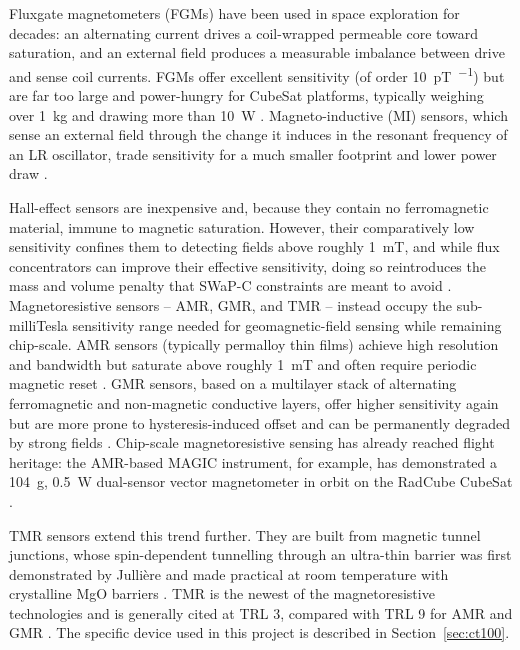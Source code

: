 \documentclass[12pt,a4paper]{article}
\begin{document}
Fluxgate magnetometers (FGMs) have been used in space exploration for decades: an alternating current drives a coil-wrapped permeable core toward saturation, and an external field produces a measurable imbalance between drive and sense coil currents. FGMs offer excellent sensitivity (of order \SI{10}{\pico\tesla\per\sqrt{\hertz}}) but are far too large and power-hungry for CubeSat platforms, typically weighing over \SI{1}{\kilo\gram} and drawing more than \SI{10}{\watt} \cite{survey-magnetic-sensing}. Magneto-inductive (MI) sensors, which sense an external field through the change it induces in the resonant frequency of an LR oscillator, trade sensitivity for a much smaller footprint and lower power draw \cite{survey-magnetic-sensing}.

Hall-effect sensors are inexpensive and, because they contain no ferromagnetic material, immune to magnetic saturation. However, their comparatively low sensitivity confines them to detecting fields above roughly \SI{1}{\milli\tesla}, and while flux concentrators can improve their effective sensitivity, doing so reintroduces the mass and volume penalty that SWaP-C constraints are meant to avoid \cite{amr-gmr-hall-bridging}. Magnetoresistive sensors -- AMR, GMR, and TMR -- instead occupy the sub-milliTesla sensitivity range needed for geomagnetic-field sensing while remaining chip-scale. AMR sensors (typically permalloy thin films) achieve high resolution and bandwidth but saturate above roughly \SI{1}{\milli\tesla} and often require periodic magnetic reset \cite{amr-gmr-hall-bridging}. GMR sensors, based on a multilayer stack of alternating ferromagnetic and non-magnetic conductive layers, offer higher sensitivity again but are more prone to hysteresis-induced offset and can be permanently degraded by strong fields \cite{amr-gmr-hall-bridging}. Chip-scale magnetoresistive sensing has already reached flight heritage: the AMR-based MAGIC instrument, for example, has demonstrated a \SI{104}{\gram}, \SI{0.5}{\watt} dual-sensor vector magnetometer in orbit on the RadCube CubeSat \cite{magic-radcube}.

TMR sensors extend this trend further. They are built from magnetic tunnel junctions, whose spin-dependent tunnelling through an ultra-thin barrier was first demonstrated by Julli\`ere \cite{julliere1975} and made practical at room temperature with crystalline MgO barriers \cite{parkin2004,yuasa2004}. TMR is the newest of the magnetoresistive technologies and is generally cited at TRL 3, compared with TRL 9 for AMR and GMR \cite{alves-thesis}. The specific device used in this project is described in Section~\ref{sec:ct100}.
\end{document}
